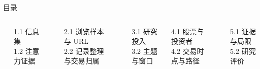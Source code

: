 \begin{frame}[label=agenda]{目录}
  \begin{columns}[T,onlytextwidth]
    \textbf{}\par
    {\small 1.1 信息集\\1.2 注意力证据}\par\medskip
    \textbf{}\par
    {\small 2.1 浏览样本与 URL\\2.2 记录整理与交易归属}\par\medskip
    \textbf{}\par
    {\small 3.1 研究投入\\3.2 主题与窗口}
    \textbf{}\par
    {\small 4.1 股票与投资者\\4.2 交易时点与路径}\par\medskip
    \textbf{}\par
    {\small 5.1 证据与局限\\5.2 研究评价}
  \end{columns}
\end{frame}
